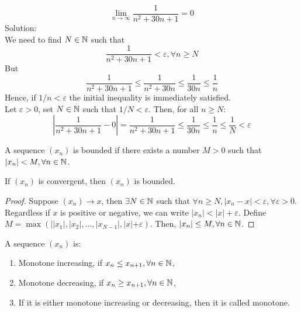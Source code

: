 \begin{eg}
    \begin{equation*}
        \lim \limits_{n \to \infty} \frac{1}{n^2 + 30n + 1} = 0
    \end{equation*}
    Solution:\\   
    We need to find $N \in \mathbb{N}$ such that
    \begin{equation*}
        \frac{1}{n^2 + 30n + 1} < \varepsilon, \forall n \geq N
    \end{equation*}
    But
    \begin{equation*}
        \frac{1}{n^2 + 30n + 1} \leq \frac{1}{n^2 + 30n} \leq \frac{1}{30n} \leq \frac{1}{n}
    \end{equation*}
    Hence, if $1/n < \varepsilon$ the initial inequality is immediately satisfied. \\
    Let $\varepsilon > 0$, set $N \in \mathbb{N}$ such that $1/N < \varepsilon$. Then, for all $n \geq N$:
    \begin{equation*}
        \left| \frac{1}{n^2+30n+1} - 0\right| = \frac{1}{n^2+30n+1} \leq  \frac{1}{30n} \leq \frac{1}{n} \leq \frac{1}{N} < \varepsilon
    \end{equation*}     
\end{eg}

\begin{definition}
    A sequence $(x_n)$ is bounded if there exists a number $M > 0$ such that $|x_n| < M, \forall n \in \mathbb{N}$.
\end{definition}

\begin{theorem}
    If $( x_n)$ is convergent, then $( x_n)$ is bounded.
\end{theorem}

\begin{proof}
    Suppose $( x_n) \to x$, then $\exists N \in \mathbb{N}$ such that $\forall n \geq N, |x_n - x| < \varepsilon, \forall \varepsilon > 0$. Regardless if $x$ is positive or negative, we can write $|x_n| < |x| + \varepsilon$. Define $M = \max (||x_1|, |x_2|, ..., |x_{N-1}|, |x| + \varepsilon )$. Then, $|x_n| \leq M, \forall n \in \mathbb{N}$. 
\end{proof}

\begin{definition}
    A sequence $( x_n )$ is:
    \begin{enumerate}
        \item Monotone increasing, if $x_n \leq x_{n+1}, \forall n \in \mathbb{N}$,
        \item Monotone decreasing, if $x_n \geq x_{n+1}, \forall n \in \mathbb{N}$,
        \item If it is either monotone increasing or decreasing, then it is called monotone.
    \end{enumerate}
\end{definition}

